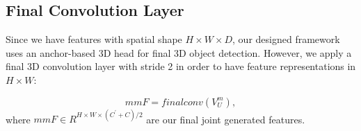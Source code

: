 \documentclass[10pt,twocolumn,letterpaper]{article}
\begin{document}
 \subsection{Final Convolution Layer}
Since we have features with spatial shape $H\times W\times D$, our designed framework uses an anchor-based 3D head for final 3D object detection. However, we apply a final 3D convolution layer with stride 2 in order to have feature representations in $H\times W$: 

\begin{equation}
    mmF = finalconv(V^m_{U}),  
    \label{finalconv_equation}
\end{equation}
%
 where $mmF \in R^{H\times W\times (C^\prime + C)/2}$ are our final joint generated features. 




\begin{table}[h!]
    \centering
    \caption{Comparisons of different methods (considering their full modal) with our mmFUSION at AP11-IoU=0.7 on KITTI \textit{val} set. (cars Only)}
    \label{tab:CarAP11_complete_models}
\end{table}
\end{document}
